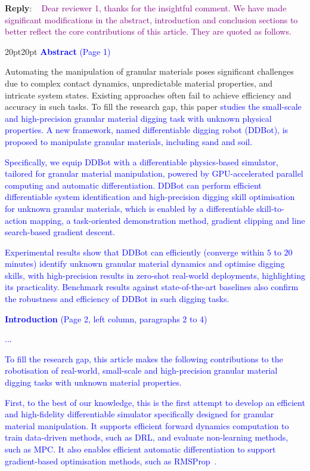 \documentclass[11pt]{article}
\newcounter{reviewer}
\newenvironment{reply}
   {\medskip \noindent \begin{sf}\textbf{Reply}: \  }
   {\medskip \end{sf}}
\newcommand{\rp}[1]{\textcolor{purple}{#1}}
\newcommand{\xt}[1]{\textcolor{blue}{#1}}
\begin{document}
\begin{reply}
\noindent\rp{Dear reviewer 1, thanks for the insightful comment. We have made significant modifications in the abstract, introduction and conclusion sections to better reflect the core contributions of this article. They are quoted as follows.}

\begin{adjustwidth}{20pt}{20pt}
\vspace{0.3cm}\noindent\xt{\textbf{Abstract} (Page 1)}

Automating the manipulation of granular materials poses significant challenges due to complex contact dynamics, unpredictable material properties, and intricate system states. Existing approaches often fail to achieve efficiency and accuracy in such tasks. To fill the research gap, this paper \xt{studies the small-scale and high-precision granular material digging task with unknown physical properties. A new framework, named differentiable digging robot (DDBot), is proposed to manipulate granular materials, including sand and soil.}

\xt{Specifically, we equip DDBot with a differentiable physics-based simulator, tailored for granular material manipulation, powered by GPU-accelerated parallel computing and automatic differentiation. DDBot can perform efficient differentiable system identification and high-precision digging skill optimisation for unknown granular materials, which is enabled by a differentiable skill-to-action mapping, a task-oriented demonstration method, gradient clipping and line search-based gradient descent.}

\xt{Experimental results show that DDBot can efficiently (converge within $5$ to $20$ minutes) identify unknown granular material dynamics and optimise digging skills, with high-precision results in zero-shot real-world deployments, highlighting its practicality. Benchmark results against state-of-the-art baselines also confirm the robustness and efficiency of DDBot in such digging tasks.}

\vspace{0.3cm}\noindent\xt{\textbf{Introduction} (Page 2, left column, paragraphs 2 to 4)}

\xt{...}

\xt{To fill the research gap, this article makes the following contributions to the robotisation of real-world, small-scale and high-precision granular material digging tasks with unknown material properties.}

\xt{First, to the best of our knowledge, this is the first attempt to develop an efficient and high-fidelity differentiable simulator specifically designed for granular material manipulation. It supports efficient forward dynamics computation to train data-driven methods, such as DRL, and evaluate non-learning methods, such as MPC. It also enables efficient automatic differentiation to support gradient-based optimisation methods, such as RMSProp~\cite{tieleman2012rmsprop}.}


\end{adjustwidth}
\end{reply}
\end{document}

